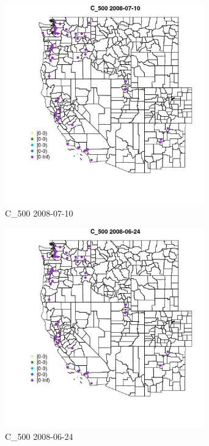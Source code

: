 \begin{figure} 
\centering  
\includegraphics[width=0.77\textwidth]{Code_Outputs/Report_ML_input_PM25_Step4_part_e_de_duplicated_aves_MapObsC_5002008-07-10.jpg} 
\caption{\label{fig:Report_ML_input_PM25_Step4_part_e_de_duplicated_avesMapObsC_5002008-07-10}C_500 2008-07-10} 
\end{figure} 
 

\clearpage 

\begin{figure} 
\centering  
\includegraphics[width=0.77\textwidth]{Code_Outputs/Report_ML_input_PM25_Step4_part_e_de_duplicated_aves_MapObsC_5002008-06-24.jpg} 
\caption{\label{fig:Report_ML_input_PM25_Step4_part_e_de_duplicated_avesMapObsC_5002008-06-24}C_500 2008-06-24} 
\end{figure} 
 

